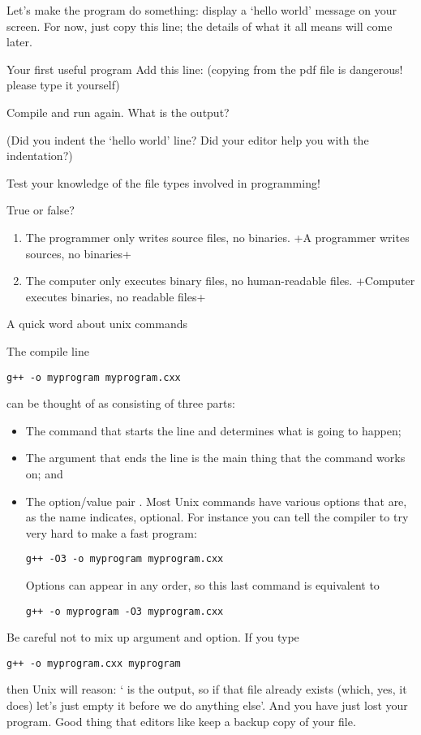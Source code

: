 Let's make the program do something:
display a `hello world' message on your screen.
For now, just copy this line; the details
of what it all means will come later.

\begin{exercise}{Your first useful program}
  \label{ex:sayhello}
Add this line:
%
%
(copying from the pdf file is dangerous! please type it yourself)

Compile and run again. What is the output? 

  (Did you indent the `hello world' line? Did your editor help you with
  the indentation?)
\end{exercise}

Test your knowledge of the file types involved in programming!

\begin{review}
  \label{q:compiler}
  True or false?
  \begin{enumerate}
  \item The programmer only writes source files, no binaries.
    \slackpollTF+A programmer writes sources, no binaries+
  \item The computer only executes binary files, no human-readable files.
    \slackpollTF+Computer executes binaries, no readable files+
  \end{enumerate}
\end{review}

 {A quick word about unix commands}

The compile line
\begin{verbatim}
g++ -o myprogram myprogram.cxx
\end{verbatim}
can be thought of as consisting of three parts:
\begin{itemize}
\item The command  that starts the line and determines what is
  going to happen;
\item The argument  that ends the line is the main
  thing that the command works on; and
\item The option/value pair . Most Unix commands have
  various options that are, as the name indicates, optional. For
  instance you can tell the compiler to try very hard to make a fast program:
\begin{verbatim}
g++ -O3 -o myprogram myprogram.cxx
\end{verbatim}
  Options can appear in any order, so this last command is equivalent to
\begin{verbatim}
g++ -o myprogram -O3 myprogram.cxx
\end{verbatim}
\end{itemize}
Be careful not to mix up argument and option. If you type
\begin{verbatim}
g++ -o myprogram.cxx myprogram
\end{verbatim}
then Unix will reason: ` is the output, so if that
file already exists (which, yes, it does) let's just empty it before
we do anything else'. And you have just lost your program.
Good thing that editors like
 keep a backup copy of your file.

